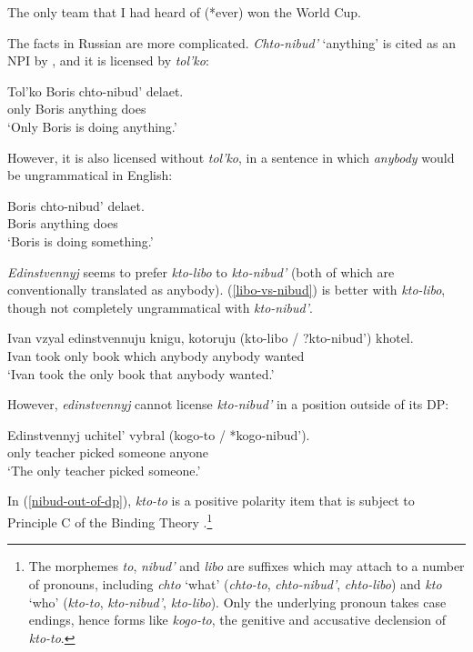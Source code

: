 \documentclass{article}
\begin{document}
\begin{exe}
	\ex The only team that I had heard of (*ever) won the World Cup.
\end{exe}

The facts in Russian are more complicated. \textit{Chto-nibud'} `anything' is cited as an NPI by \citet{russneg}, and it is licensed by \textit{tol'ko}:

\begin{exe}
	\ex \gll Tol'ko Boris chto-nibud' delaet.\\
	only Boris anything does\\
	\glt `Only Boris is doing anything.'
\end{exe}

However, it is also licensed without \textit{tol'ko}, in a sentence in which \textit{anybody} would be ungrammatical in English:

\begin{exe}
	\ex \label{nibud-no-polarity} \gll Boris chto-nibud' delaet.\\
	Boris anything does\\
	\glt `Boris is doing something.' %
\end{exe}

\textit{Edinstvennyj} seems to prefer \textit{kto-libo} to \textit{kto-nibud'} (both of which are conventionally translated as anybody). (\ref{libo-vs-nibud}) is better with \textit{kto-libo}, though not completely ungrammatical with \textit{kto-nibud'}.

\begin{exe}
	\ex \label{libo-vs-nibud} \gll Ivan vzyal edinstvennuju knigu, kotoruju (kto-libo / ?kto-nibud') khotel.\\
	Ivan took only book which anybody {} anybody wanted\\
	\glt `Ivan took the only book that anybody wanted.'
\end{exe}

However, \textit{edinstvennyj} cannot license \textit{kto-nibud'} in a position outside of its DP:

\begin{exe}
	\ex \label{nibud-out-of-dp} \gll Edinstvennyj uchitel' vybral (kogo-to / *kogo-nibud').\\
	only teacher picked someone {} anyone\\
	\glt `The only teacher picked someone.'
\end{exe}

In (\ref{nibud-out-of-dp}), \textit{kto-to}	is a positive polarity item that is subject to Principle C of the Binding Theory \citep{russneg}.\footnote{The morphemes \textit{to}, \textit{nibud'} and \textit{libo} are suffixes which may attach to a number of pronouns, including \textit{chto} `what' (\textit{chto-to}, \textit{chto-nibud'}, \textit{chto-libo}) and \textit{kto} `who' (\textit{kto-to}, \textit{kto-nibud'}, \textit{kto-libo}). Only the underlying pronoun takes case endings, hence forms like \textit{kogo-to}, the genitive and accusative declension of \textit{kto-to}.}
\end{document}
